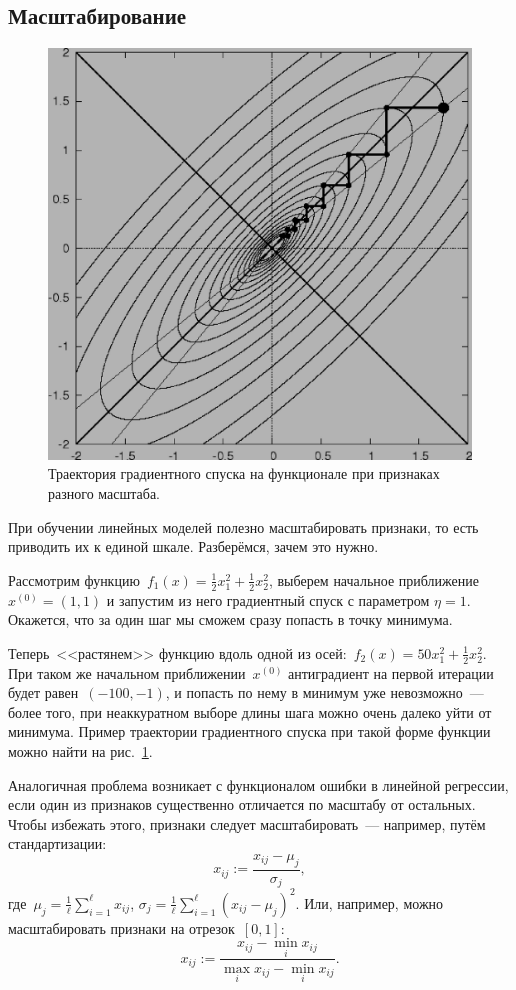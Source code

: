 \documentclass[12pt,fleqn]{article}
\begin{document}
\subsection{Масштабирование}

\begin{figure}[t]
    \centering
    \includegraphics[width=0.4\linewidth]{descent.eps}
    \caption{Траектория градиентного спуска на функционале при признаках разного масштаба.}
    \label{pic:descent}
\end{figure}

При обучении линейных моделей полезно масштабировать признаки, то есть приводить их к единой шкале.
Разберёмся, зачем это нужно.

Рассмотрим функцию~$f_1(x) = \frac{1}{2} x_1^2 + \frac{1}{2} x_2^2$, выберем начальное приближение~$x^{(0)} = (1, 1)$
и запустим из него градиентный спуск с параметром $\eta = 1$.
Окажется, что за один шаг мы сможем сразу попасть в точку минимума.

Теперь~<<растянем>> функцию вдоль одной из осей:~$f_2(x) = 50 x_1^2 + \frac{1}{2} x_2^2$.
При таком же начальном приближении~$x^{(0)}$ антиградиент на первой итерации будет равен~$(-100, -1)$,
и попасть по нему в минимум уже невозможно~--- более того, при неаккуратном выборе длины шага можно
очень далеко уйти от минимума.
Пример траектории градиентного спуска при такой форме функции можно найти на рис.~\ref{pic:descent}.

Аналогичная проблема возникает с функционалом ошибки в линейной регрессии, если один из признаков
существенно отличается по масштабу от остальных.
Чтобы избежать этого, признаки следует масштабировать~--- например, путём стандартизации:
\[
    x_{ij}
    :=
    \frac{x_{ij} - \mu_j}{\sigma_j},
\]
где~$\mu_j = \frac{1}{\ell} \sum_{i = 1}^{\ell} x_{ij}$,
$\sigma_j = \frac{1}{\ell} \sum_{i = 1}^{\ell} (x_{ij} - \mu_j)^2$.
Или, например, можно масштабировать признаки на отрезок~$[0, 1]$:
\[
    x_{ij}
    :=
    \frac{x_{ij} - \min_i x_{ij}}{\max_i x_{ij} - \min_i x_{ij}}.
\]
\end{document}
